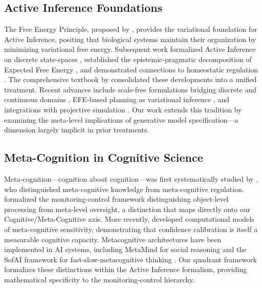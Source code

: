 \documentclass[
]{article}
\begin{document}
\subsection{Active Inference
Foundations}\label{active-inference-foundations}

The Free Energy Principle, proposed by \cite{friston2010free}, provides
the variational foundation for Active Inference, positing that
biological systems maintain their organization by minimizing variational
free energy. Subsequent work formalized Active Inference on discrete
state-spaces \cite{dacosta2020active}, established the
epistemic-pragmatic decomposition of Expected Free Energy
\cite{friston2015active}, and demonstrated connections to homeostatic
regulation \cite{pezzulo2015active}. The comprehensive textbook by
\cite{parr2022active} consolidated these developments into a unified
treatment. Recent advances include scale-free formulations bridging
discrete and continuous domains \cite{friston2025scalefree}, EFE-based
planning as variational inference \cite{champion2025efeplanning}, and
integrations with projective simulation \cite{feps2025}. Our work
extends this tradition by examining the meta-level implications of
generative model specification---a dimension largely implicit in prior
treatments.

\subsection{Meta-Cognition in Cognitive
Science}\label{meta-cognition-in-cognitive-science}

Meta-cognition---cognition about cognition---was first systematically
studied by \cite{flavell1979metacognition}, who distinguished
meta-cognitive knowledge from meta-cognitive regulation.
\cite{nelson1990metamemory} formalized the monitoring-control framework
distinguishing object-level processing from meta-level oversight, a
distinction that maps directly onto our Cognitive/Meta-Cognitive axis.
More recently, \cite{fleming2012metacognition} developed computational
models of meta-cognitive sensitivity, demonstrating that confidence
calibration is itself a measurable cognitive capacity. Metacognitive
architectures have been implemented in AI systems, including MetaMind
for social reasoning \cite{metamind2025} and the SofAI framework for
fast-slow-metacognitive thinking \cite{sofai2025}. Our quadrant
framework formalizes these distinctions within the Active Inference
formalism, providing mathematical specificity to the monitoring-control
hierarchy.
\end{document}
